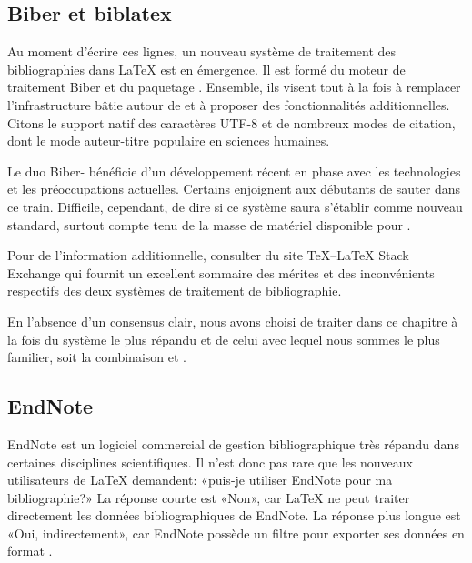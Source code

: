 \subsection{Biber et biblatex}
\label{sec:bibliographie:systeme:biblatex}

Au moment d'écrire ces lignes, un nouveau système de traitement des
bibliographies dans {\LaTeX} est en émergence. Il est formé du moteur
de traitement Biber \citep{biber} et du paquetage 
\citep{biblatex}. Ensemble, ils visent tout à la fois à remplacer
l'infrastructure bâtie autour de {\BibTeX} et à proposer des
fonctionnalités additionnelles. Citons le support natif des caractères
UTF-8 et de nombreux modes de citation, dont le mode
auteur-titre populaire en sciences humaines.

Le duo Biber- bénéficie d'un développement récent en
phase avec les technologies et les préoccupations actuelles. Certains
enjoignent aux débutants de sauter dans ce train. Difficile,
cependant, de dire si ce système saura s'établir comme nouveau
standard, surtout compte tenu de la masse de matériel disponible pour
{\BibTeX}.

Pour de l'information additionnelle, consulter %
du site {\TeX}--{\LaTeX} Stack Exchange qui fournit un excellent
sommaire des mérites et des inconvénients respectifs des deux systèmes
de traitement de bibliographie.

En l'absence d'un consensus clair, nous avons choisi de traiter dans
ce chapitre à la fois du système le plus répandu et de celui avec
lequel nous sommes le plus familier, soit la combinaison {\BibTeX} et
.

\subsection{EndNote}
\label{sec:bibliographie:systeme:endnote}

EndNote est un logiciel commercial de gestion bibliographique très
répandu dans certaines disciplines scientifiques. Il n'est donc pas
rare que les nouveaux utilisateurs de {\LaTeX} demandent: «puis-je
utiliser EndNote pour ma bibliographie?» La réponse courte est «Non»,
car {\LaTeX} ne peut traiter directement les données bibliographiques
de EndNote. La réponse plus longue est «Oui, indirectement»,
car EndNote possède un filtre pour exporter ses données en format
{\BibTeX}.

